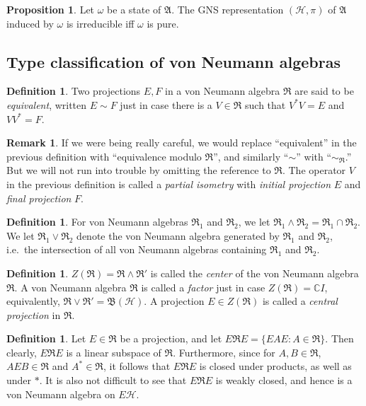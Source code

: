 \documentclass[11pt]{article}
\newcommand{\alg}[1]{\mathfrak{#1}}
\newcommand{\bh}{\mathfrak{B}(\mathcal{H})}
\theoremstyle{definition}
\newtheorem{prop}[thm]{Proposition}
\theoremstyle{definition}
\newtheorem{defn}[thm]{Definition}
\newtheorem{note}[thm]{Remark}
\theoremstyle{remark}
\def\2#1{{\mathcal #1}}
\def\7#1{{\mathbb #1}}
\def\al#1{{\mathfrak #1}}
\def\om{\omega} \def\Om{\Omega} \def\dd{\partial} \def\D{\Delta}
\begin{document}
\begin{prop} Let $\om$ be a state of $\alg{A}$. The GNS representation
  $(\2H ,\pi )$ of $\alg{A}$ induced by $\om$ is irreducible iff $\om$
  is pure.  \label{pure-irred}
\end{prop}

\bigskip {}


\subsection{Type classification of von Neumann algebras}

\begin{defn} Two projections $E,F$ in a von Neumann algebra $\alg{R}$ are said to be
  \emph{equivalent}, written $E\sim F$ just in case there is a $V\in \alg{R}$ such
  that $V^*V=E$ and $VV^*=F$.  \end{defn}

\begin{note} If we were being really careful, we would replace ``equivalent'' in the
  previous definition with ``equivalence modulo $\alg{R}$'', and similarly ``$\sim$''
  with ``$\sim _{\alg{R}}$.''  But we will not run into trouble by omitting the
  reference to $\alg{R}$.  The operator $V$ in the previous definition is called a
  \emph{partial isometry} with \emph{initial projection} $E$ and \emph{final
    projection} $F$. \end{note}

\begin{defn} For von Neumann algebras $\al R_1$ and
  $\al R_2$, we let $\al R_1\wedge \al R_2=\al R_1\cap
  \al R_2$.  We let $\al R_1\vee \al R_2$ denote the
  von Neumann algebra generated by $\al R_1$ and $\al
  R_2$, i.e.\ the intersection of all von Neumann
  algebras containing $\al R_1$ and $\al
  R_2$.  \end{defn}

\begin{defn} $Z(\al R)=\al R\wedge \al R'$ is called
  the \emph{center} of the von Neumann algebra $\al R$.
  A von Neumann algebra $\al R$ is called a
  \emph{factor} just in case $Z(\al R)=\7C I$,
  equivalently, $\al R\vee \al R'=\bh$.  A projection
  $E\in Z(\al R)$ is called a \emph{central projection}
  in $\al R$.
\end{defn}

\begin{defn} Let $E\in \alg{R}$ be a projection, and
  let $E\alg{R}E=\{ EAE:A\in \alg{R}\}$.  Then clearly,
  $E\alg{R}E$ is a linear subspace of $\alg{R}$.
  Furthermore, since for $A,B\in \alg{R}$, $AEB\in
  \alg{R}$ and $A^*\in \alg{R}$, it follows that
  $E\alg{R}E$ is closed under products, as well as
  under $*$.  It is also not difficult to see that
  $E\alg{R}E$ is weakly closed, and hence is a von
  Neumann algebra on $E\2H$.
\end{defn}
\end{document}
